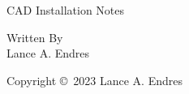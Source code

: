 
\hypersetup{pageanchor=false}
\begin{titlepage}
\thispagestyle{ledateinfooter}
\begin{center}
\bfseries

\LARGE CAD Installation Notes\\


\vfill

\large Written By\\
\Large Lance A. Endres\\

\vfill

\normalsize Copyright \copyright\ 2023 Lance A. Endres

\end{center}
\end{titlepage}

\hypersetup{pageanchor=true} 